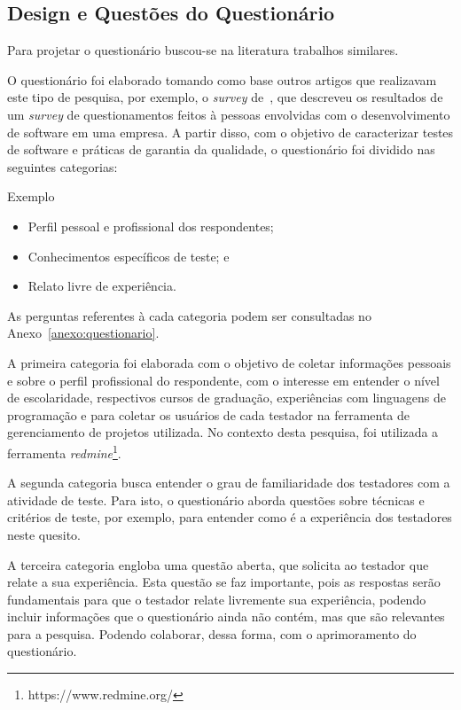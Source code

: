 \subsection{Design e Questões do Questionário}
\label{sec:desingquestions}

Para projetar o questionário buscou-se na literatura trabalhos similares.

O questionário foi elaborado tomando como base outros artigos que realizavam este tipo de pesquisa, por exemplo, o \textit{survey} de~\cite{geras2004survey}, que descreveu os resultados de um \textit{survey} de questionamentos feitos à pessoas envolvidas com o desenvolvimento de software em uma empresa. A partir disso, com o objetivo de caracterizar testes de software e práticas de garantia da qualidade, o questionário foi dividido nas seguintes categorias:

Exemplo \cite{model1980multiprocessing}

\begin{itemize}
\item  Perfil pessoal e profissional dos respondentes;
\item  Conhecimentos específicos de teste; e
\item  Relato livre de experiência.
\end{itemize}

As perguntas referentes à cada categoria podem ser consultadas no Anexo~\ref{anexo:questionario}.

A primeira categoria foi elaborada com o objetivo de coletar informações pessoais e sobre o perfil profissional do respondente, com o interesse em entender o nível de escolaridade, respectivos cursos de graduação, experiências com linguagens de programação e para coletar os usuários de cada testador na ferramenta de gerenciamento de projetos utilizada. No contexto desta pesquisa, foi utilizada a ferramenta \textit{redmine}\footnote{https://www.redmine.org/}.

A segunda categoria busca entender o grau de familiaridade dos testadores com a atividade de teste. Para isto, o questionário aborda questões sobre técnicas e critérios de teste, por exemplo, para entender como é a experiência dos testadores neste quesito.

A terceira categoria engloba uma questão aberta, que solicita ao testador que relate a sua experiência. Esta questão se faz importante, pois as respostas serão fundamentais para que o testador relate livremente sua experiência, podendo incluir informações que o questionário ainda não contém, mas que são relevantes para a pesquisa. Podendo colaborar, dessa forma, com o aprimoramento do questionário.


